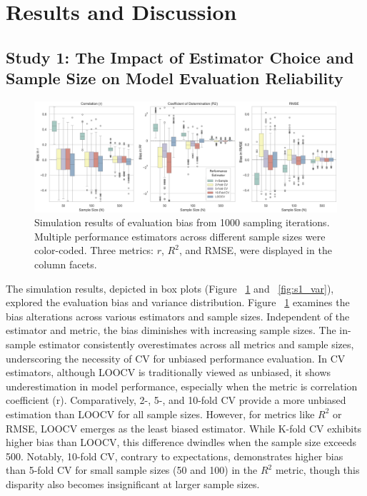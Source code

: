 \section{Results and Discussion}

\subsection{Study 1: The Impact of Estimator Choice and Sample Size on Model Evaluation Reliability}

\begin{figure}[H]
    \centering
    \includegraphics[width=1\textwidth]{fig_s1_bias.jpg}
    \caption{Simulation results of evaluation bias from 1000 sampling iterations. Multiple performance estimators across different sample sizes were color-coded. Three metrics: $r$, $R^2$, and RMSE, were displayed in the column facets.}
    \label{fig:s1_bias}
\end{figure}

The simulation results, depicted in box plots (Figure ~\ref{fig:s1_bias} and ~\ref{fig:s1_var}), explored the evaluation bias and variance distribution. Figure ~\ref{fig:s1_bias} examines the bias alterations across various estimators and sample sizes. Independent of the estimator and metric, the bias diminishes with increasing sample sizes. The in-sample estimator consistently overestimates across all metrics and sample sizes, underscoring the necessity of CV for unbiased performance evaluation. In CV estimators, although LOOCV is traditionally viewed as unbiased, it shows underestimation in model performance, especially when the metric is correlation coefficient (r). Comparatively, 2-, 5-, and 10-fold CV provide a more unbiased estimation than LOOCV for all sample sizes. However, for metrics like $R^2$ or RMSE, LOOCV emerges as the least biased estimator. While K-fold CV exhibits higher bias than LOOCV, this difference dwindles when the sample size exceeds 500. Notably, 10-fold CV, contrary to expectations, demonstrates higher bias than 5-fold CV for small sample sizes (50 and 100) in the $R^2$ metric, though this disparity also becomes insignificant at larger sample sizes.


